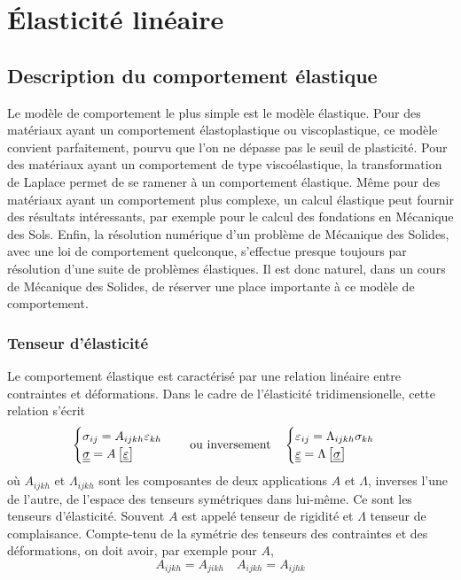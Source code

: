\chapter{Élasticité linéaire} \label{chap:Ch05}
\section{Description du comportement élastique} \label{sec:Ch05-1}
Le modèle de comportement le plus simple est le modèle élastique.
Pour des matériaux ayant un comportement élastoplastique ou viscoplastique, ce modèle convient parfaitement, pourvu que l'on ne dépasse pas le seuil de plasticité.
Pour des matériaux ayant un comportement de type viscoélastique, la transformation de Laplace permet de se ramener à un comportement élastique.
Même pour des matériaux ayant un comportement plus complexe, un calcul élastique peut fournir des résultats intéressants, par exemple pour le calcul des fondations en Mécanique des Sols.
Enfin, la résolution numérique d'un problème de Mécanique des Solides, avec une loi de comportement quelconque, s'effectue presque toujours par résolution d'une suite de problèmes élastiques.
Il est donc naturel, dans un cours de Mécanique des Solides, de réserver une place importante à ce modèle de comportement.

\subsection{Tenseur d'élasticité} \label{ssec:Ch05-1.1}
Le comportement élastique est caractérisé par une relation linéaire entre contraintes et déformations.
Dans le cadre de l'élasticité tridimensionelle, cette relation s'écrit
\begin{equation}
    \begin{cases}
        \sigma_{ij} = A_{ijkh} \varepsilon_{kh}\\
        \underline{\underline{\sigma}} = A \left[ \underline{\underline{\varepsilon}} \right]
    \end{cases}
\quad\text{ou inversement}\quad
\begin{cases}
 \varepsilon_{ij} = \Lambda_{ijkh} \sigma_{kh} \\
\underline{\underline{\varepsilon}} = \Lambda \left[ \underline{\underline{\sigma}} \right]
    \end{cases}
    \label{eq:Ch05-001}
\end{equation}
où $A_{ijkh}$ et $\Lambda_{ijkh}$ sont les composantes de deux applications $A$ et $\Lambda$, inverses l'une de l'autre, de l'espace des tenseurs symétriques dans lui-même.
Ce sont les tenseurs d'élasticité.
Souvent $A$ est appelé tenseur de rigidité et $\Lambda$ tenseur de complaisance.
Compte-tenu de la symétrie des tenseurs des contraintes et des déformations, on doit avoir, par exemple pour $A$,
\begin{equation}
    A_{ijkh} = A_{jikh} \quad A_{ijkh} = A_{ijhk}
    \label{eq:Ch05-002}
\end{equation}

